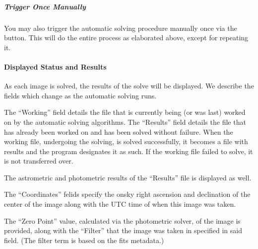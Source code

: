 \documentclass[letterpaper,11pt,english]{sphinxmanual}
\begin{document}
\subparagraph{Trigger Once Manually}
\label{\detokenize{user/automatic_mode:trigger-once-manually}}
\sphinxAtStartPar
You may also trigger the automatic solving procedure manually once via the
 button. This will do the entire process as elaborated above,
except for repeating it.


\paragraph{Displayed Status and Results}
\label{\detokenize{user/automatic_mode:displayed-status-and-results}}
\sphinxAtStartPar
As each image is solved, the results of the solve will be displayed. We
describe the fields which change as the automatic solving runs.

\sphinxAtStartPar
The “Working” field details the file that is currently being (or was last)
worked on by the automatic solving algorithms. The “Results” field details
the file that has already been worked on and has been solved without failure.
When the working file, undergoing the solving, is solved successfully, it
becomes a file with results and the program designates it as such. If the
working file failed to solve, it is not transferred over.

\sphinxAtStartPar
The astrometric and photometric results of the “Results” file is displayed
as well.

\sphinxAtStartPar
The “Coordinates” felids specify the on\sphinxhyphen{}sky right ascension and declination
of the center of the image along with the UTC time of when this image was
taken.

\sphinxAtStartPar
The “Zero Point” value, calculated via the photometric solver, of the image
is provided, along with the “Filter” that the image was taken in specified in
said field. (The filter term is based on the fits metadata.)
\end{document}
